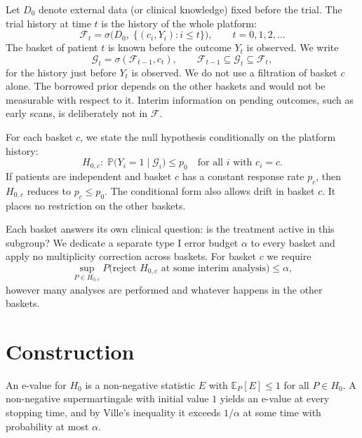 \documentclass[11pt,a4paper]{article}
\theoremstyle{definition}
\theoremstyle{remark}
\newcommand{\F}{\mathcal{F}}
\newcommand{\G}{\mathcal{G}}
\newcommand{\E}{\mathbb{E}}
\renewcommand{\P}{\mathbb{P}}
\begin{document}
Let $D_0$ denote external data (or clinical knowledge) fixed before the trial.
The trial history at time $t$ is the history of the whole platform:
\begin{equation}\label{eq:filtration}
  \F_t = \sigma\big( D_0,\; \{(c_i, Y_i) : i \le t\} \big), \qquad t = 0, 1, 2, \dots
\end{equation}
The basket of patient $t$ is known before the outcome $Y_t$ is observed.
We write
\begin{equation}\label{eq:pre-outcome}
  \G_t = \sigma(\F_{t-1}, c_t), \qquad \F_{t-1} \subseteq \G_t \subseteq \F_t,
\end{equation}
for the history just before $Y_t$ is observed.
We do not use a filtration of basket $c$ alone.
The borrowed prior depends on the other baskets and would not be measurable with respect to it.
Interim information on pending outcomes, such as early scans, is deliberately not in $\F$.

For each basket $c$, we state the null hypothesis conditionally on the platform history:
\begin{equation}\label{eq:hypotheses}
  H_{0,c}\colon\; \P\big(Y_i = 1 \mid \G_i\big) \le p_0 \quad \text{for all } i \text{ with } c_i = c .
\end{equation}
If patients are independent and basket $c$ has a constant response rate $p_c$, then $H_{0,c}$ reduces to $p_c \le p_0$.
The conditional form also allows drift in basket $c$.
It places no restriction on the other baskets.

Each basket answers its own clinical question: is the treatment active in this subgroup?
We dedicate a separate type I error budget $\alpha$ to every basket and apply no multiplicity correction across baskets.
For basket $c$ we require
\begin{equation}\label{eq:criterion}
  \sup_{P \in H_{0,c}} P\big( \text{reject } H_{0,c} \text{ at some interim analysis} \big) \le \alpha ,
\end{equation}
however many analyses are performed and whatever happens in the other baskets.

\section{Construction}\label{sec:construction}

An e-value for $H_0$ is a non-negative statistic $E$ with $\E_P[E] \le 1$ for all $P \in H_0$.
A non-negative supermartingale with initial value $1$ yields an e-value at every stopping time, and by Ville's inequality it exceeds $1/\alpha$ at some time with probability at most $\alpha$.
\end{document}
